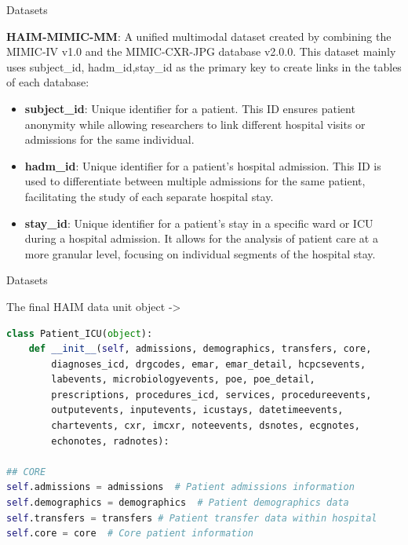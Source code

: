 \documentclass{sintefbeamer}
\theoremstyle{definition}
\begin{document}
\begin{frame}{Datasets}

\footnotesize \textbf{HAIM-MIMIC-MM}: A unified multimodal dataset created by combining the MIMIC-IV v1.0 and the MIMIC-CXR-JPG database v2.0.0. This dataset mainly uses subject\_id, hadm\_id,stay\_id as the primary key to create links in the tables of each database:
\begin{itemize}
    \item \textbf{subject\_id}: Unique identifier for a patient. This ID ensures patient anonymity while allowing researchers to link different hospital visits or admissions for the same individual.
    \item \textbf{hadm\_id}: Unique identifier for a patient's hospital admission. This ID is used to differentiate between multiple admissions for the same patient, facilitating the study of each separate hospital stay.
    \item \textbf{stay\_id}: Unique identifier for a patient's stay in a specific ward or ICU during a hospital admission. It allows for the analysis of patient care at a more granular level, focusing on individual segments of the hospital stay.
\end{itemize}
\end{frame}

\begin{frame}[fragile]{Datasets}

\footnotesize
The final HAIM data unit object ->
\begin{lstlisting}[language=Python]
class Patient_ICU(object):
    def __init__(self, admissions, demographics, transfers, core,
        diagnoses_icd, drgcodes, emar, emar_detail, hcpcsevents,
        labevents, microbiologyevents, poe, poe_detail,
        prescriptions, procedures_icd, services, procedureevents,
        outputevents, inputevents, icustays, datetimeevents,
        chartevents, cxr, imcxr, noteevents, dsnotes, ecgnotes,
        echonotes, radnotes):

## CORE
self.admissions = admissions  # Patient admissions information
self.demographics = demographics  # Patient demographics data
self.transfers = transfers # Patient transfer data within hospital
self.core = core  # Core patient information

\end{lstlisting}
\end{frame}
\end{document}
